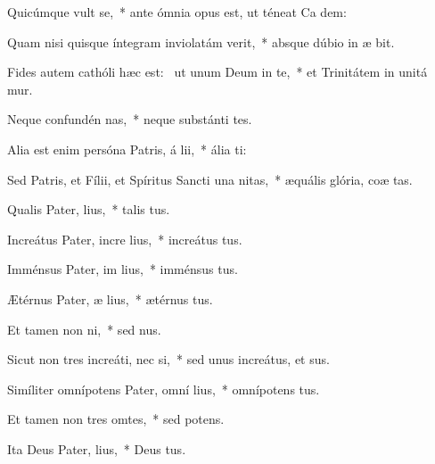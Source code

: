 \item Quicúmque vult  se,~* ante ómnia opus est, ut téneat Ca dem:
\item Quam nisi quisque íntegram inviolatám verit,~* absque dúbio in æ bit.
\item Fides autem cathóli hæc est:~\pscross{} ut unum Deum in te,~* et Trinitátem in unitá mur.
\item Neque confundén nas,~* neque substánti tes.
\item Alia est enim persóna Patris, á lii,~* ália  ti:
\item Sed Patris, et Fílii, et Spíritus Sancti una  nitas,~* æquális glória, coæ tas.
\item Qualis Pater,  lius,~* talis  tus.
\item Increátus Pater, incre lius,~* increátus  tus.
\item Imménsus Pater, im lius,~* imménsus  tus.
\item Ætérnus Pater, æ lius,~* ætérnus  tus.
\item Et tamen non  ni,~* sed  nus.
\item Sicut non tres increáti, nec  si,~* sed unus increátus, et  sus.
\item Simíliter omnípotens Pater, omní lius,~* omnípotens  tus.
\item Et tamen non tres omtes,~* sed  potens.
\item Ita Deus Pater,  lius,~* Deus  tus.
